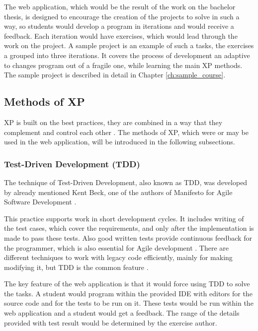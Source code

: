 The web application, which would be the result of the work on the bachelor thesis, is designed to encourage the creation of the projects to solve in such a way, so students would develop a program in iterations and would receive a feedback. Each iteration would have exercises, which would lead through the work on the project. A sample project is an example of such a tasks, the exercises a grouped into three iterations. It covers the process of development an adaptive to changes program out of a fragile one, while learning the main XP methods. The sample project is described in detail in Chapter \ref{ch:sample_course}.

\subsection{Methods of XP}

XP is built on the best practices, they are combined in a way that they complement and control each other \cite[Foreword]{xp_explained}. The methods of XP, which were or may be used in the web application, will be introduced in the following subsections.

\subsubsection{Test-Driven Development (TDD)}

The technique of Test-Driven Development, also known as TDD, was developed by already mentioned Kent Beck, one of the authors of Manifesto for Agile Software Development \cite{tdd_example}.

This practice supports work in short development cycles. It includes writing of the test cases, which cover the requirements, and only after the implementation is made to pass these tests. Also good written tests provide continuous feedback for the programmer, which is also essential for Agile development \cite{tdd_dp}. There are different techniques to work with legacy code efficiently, mainly for making modifying it, but TDD is the common feature \cite[Test-Driven Development (TDD)]{lc_effectively}.

The key feature of the web application is that it would force using TDD to solve the tasks. A student would program within the provided IDE with editors for the source code and for the tests to be run on it. These tests would be run within the web application and a student would get a feedback. The range of the details provided with test result would be determined by the exercise author. 

